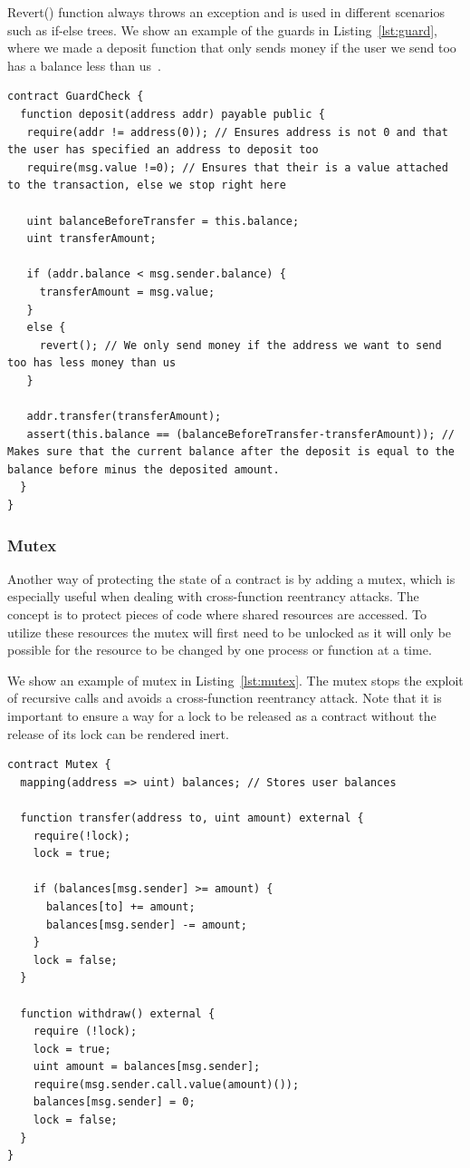 \documentclass[10pt,conference]{IEEEtran}
\begin{document}
Revert() function always throws an exception and is used in different scenarios such as if-else trees. We show an example of the guards in Listing~\ref{lst:guard}, where we made a deposit function that only sends money if the user we send too has a balance less than us~\cite{guardcheck}.

\begin{lstlisting}[language=Solidity, caption=Guard Check pattern, label={lst:guard}]
contract GuardCheck {
  function deposit(address addr) payable public {
   require(addr != address(0)); // Ensures address is not 0 and that the user has specified an address to deposit too
   require(msg.value !=0); // Ensures that their is a value attached to the transaction, else we stop right here
        
   uint balanceBeforeTransfer = this.balance;
   uint transferAmount;
        
   if (addr.balance < msg.sender.balance) {
     transferAmount = msg.value;
   }
   else {
     revert(); // We only send money if the address we want to send too has less money than us
   }
        
   addr.transfer(transferAmount);
   assert(this.balance == (balanceBeforeTransfer-transferAmount)); // Makes sure that the current balance after the deposit is equal to the balance before minus the deposited amount. 
  }  
}
\end{lstlisting}

\subsubsection{Mutex}

Another way of protecting the state of a contract is by adding a mutex, which is especially useful when dealing with cross-function reentrancy attacks. The concept is to protect pieces of code where shared resources are accessed. To utilize these resources the mutex will first need to be unlocked as it will only be possible for the resource to be changed by one process or function at a time. 

We show an example of mutex in Listing~\ref{lst:mutex}. The mutex stops the exploit of recursive calls and avoids a cross-function reentrancy attack. Note that it is important to ensure a way for a lock to be released as a contract without the release of its lock can be rendered inert.

\begin{lstlisting}[language=Solidity, caption=Mutual exclusion, label={lst:mutex}]
contract Mutex {
  mapping(address => uint) balances; // Stores user balances

  function transfer(address to, uint amount) external {
    require(!lock);
    lock = true;
        
    if (balances[msg.sender] >= amount) {
      balances[to] += amount;
      balances[msg.sender] -= amount;
    }
    lock = false;
  }

  function withdraw() external {
    require (!lock);
    lock = true;
    uint amount = balances[msg.sender];
    require(msg.sender.call.value(amount)());
    balances[msg.sender] = 0;
    lock = false;
  }
}
\end{lstlisting}
\end{document}
